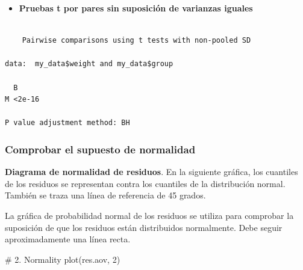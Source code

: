 \documentclass[
  letterpaper,
  DIV=11,
  numbers=noendperiod]{scrartcl}
\newenvironment{Shaded}{\begin{snugshade}}{\end{snugshade}}
\newcommand{\AttributeTok}[1]{\textcolor[rgb]{0.40,0.45,0.13}{#1}}
\newcommand{\CommentTok}[1]{\textcolor[rgb]{0.37,0.37,0.37}{#1}}
\newcommand{\ConstantTok}[1]{\textcolor[rgb]{0.56,0.35,0.01}{#1}}
\newcommand{\DecValTok}[1]{\textcolor[rgb]{0.68,0.00,0.00}{#1}}
\newcommand{\FunctionTok}[1]{\textcolor[rgb]{0.28,0.35,0.67}{#1}}
\newcommand{\NormalTok}[1]{\textcolor[rgb]{0.00,0.23,0.31}{#1}}
\newcommand{\SpecialCharTok}[1]{\textcolor[rgb]{0.37,0.37,0.37}{#1}}
\newcommand{\StringTok}[1]{\textcolor[rgb]{0.13,0.47,0.30}{#1}}
\providecommand{\tightlist}{%
  \setlength{\itemsep}{0pt}\setlength{\parskip}{0pt}}\usepackage{longtable,booktabs,array}
\begin{document}
\begin{itemize}
\tightlist
\item
  \textbf{Pruebas t por pares sin suposición de varianzas iguales}
\end{itemize}

\begin{Shaded}
\end{Shaded}

\begin{verbatim}

    Pairwise comparisons using t tests with non-pooled SD 

data:  my_data$weight and my_data$group 

  B     
M <2e-16

P value adjustment method: BH 
\end{verbatim}

\hypertarget{comprobar-el-supuesto-de-normalidad}{%
\subsubsection{Comprobar el supuesto de
normalidad}\label{comprobar-el-supuesto-de-normalidad}}

\textbf{Diagrama de normalidad de residuos}. En la siguiente gráfica,
los cuantiles de los residuos se representan contra los cuantiles de la
distribución normal. También se traza una línea de referencia de 45
grados.

La gráfica de probabilidad normal de los residuos se utiliza para
comprobar la suposición de que los residuos están distribuidos
normalmente. Debe seguir aproximadamente una línea recta.

\begin{Shaded}
\begin{Highlighting}[]
\CommentTok{\# 2. Normality}
\FunctionTok{plot}\NormalTok{(res.aov, }\DecValTok{2}\NormalTok{)}
\end{Highlighting}
\end{Shaded}
\end{document}
